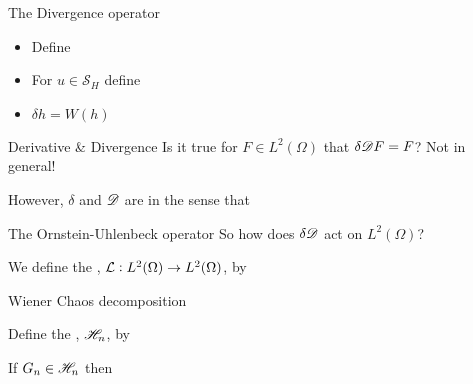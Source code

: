 \documentclass{beamer}
\begin{document}
\begin{frame}{The Divergence operator}
    \begin{definition}
    \begin{itemize}
        \item Define \pause
        \item For $u\in\mathcal{S}_H$ define \pause
    \end{itemize}    
    \end{definition}
    
    \vspace{-0.3cm}
    \begin{example}
    \begin{itemize}
        \item $\delta h = W(h)$
    \end{itemize}
    \end{example}               
\end{frame}

\begin{frame}{Derivative \& Divergence}
    Is it true for $F\in L^2(\Omega)$ that $\delta\mathscr{D} F = F$?\pause
    \newline
    Not in general!\pause
    
    \vspace{0.5cm}
    However, $\delta$ and $\mathscr{D}$ are  in the sense that 
\end{frame}
\begin{frame}{The Ornstein-Uhlenbeck operator}
    So how does $\delta\mathscr{D}$ act on $L^2(\Omega)$?\pause
    
    \vspace{0.5cm}
    \begin{definition}
    We define the , $\mathcal{L}:L^2(\Omega)\to L^2(\Omega)$, by 
    \end{definition}
\end{frame}
\begin{frame}{Wiener Chaos decomposition}
    \begin{definition}
    Define the , $\mathscr{H}_n$, by 
    \end{definition}\pause
    \begin{proposition}
    If $G_n\in\mathscr{H}_n$ then 
    \end{proposition}
\end{frame}
\end{document}
